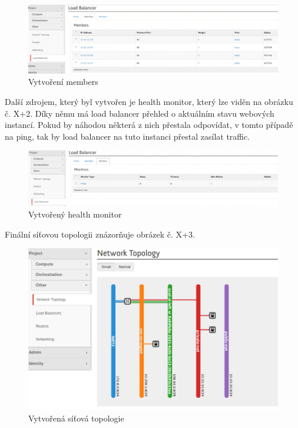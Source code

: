 \begin{figure}[h]
\begin{centering}
\includegraphics[scale=0.45]{images/lbaas2}
\par\end{centering}
\caption{Vytvoření members\label{fig:lbaas2}}
\end{figure}

Další zdrojem, který byl vytvořen je health monitor, který lze viděn na obrázku č. X+2. Díky němu má load balancer přehled o aktuálním stavu webových instancí. Pokud by náhodou některá z nich přestala odpovídat, v tomto případě na ping, tak by load balancer na tuto instanci přestal zasílat traffic.

\begin{figure}[h]
\begin{centering}
\includegraphics[scale=0.45]{images/lbaas3}
\par\end{centering}
\caption{Vytvořený health monitor\label{fig:lbaas3}}
\end{figure}

Finální síťovou topologii znázorňuje obrázek č. X+3. 


\begin{figure}[h]
\begin{centering}
\includegraphics[scale=0.45]{images/lbaas_topologie}
\par\end{centering}
\caption{Vytvořená síťová topologie\label{fig:lbaas_topologie}}
\end{figure}

